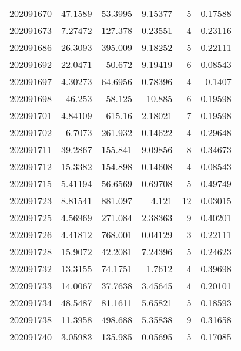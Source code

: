 \begin{tabular}{rrrrrr}
 202091670 &         47.1589  &       53.3995 &            9.15377 &           5 & 0.17588 \\
 202091673 &          7.27472 &      127.378  &            0.23551 &           4 & 0.23116 \\
 202091686 &         26.3093  &      395.009  &            9.18252 &           5 & 0.22111 \\
 202091692 &         22.0471  &       50.672  &            9.19419 &           6 & 0.08543 \\
 202091697 &          4.30273 &       64.6956 &            0.78396 &           4 & 0.1407  \\
 202091698 &         46.253   &       58.125  &           10.885   &           6 & 0.19598 \\
 202091701 &          4.84109 &      615.16   &            2.18021 &           7 & 0.19598 \\
 202091702 &          6.7073  &      261.932  &            0.14622 &           4 & 0.29648 \\
 202091711 &         39.2867  &      155.841  &            9.09856 &           8 & 0.34673 \\
 202091712 &         15.3382  &      154.898  &            0.14608 &           4 & 0.08543 \\
 202091715 &          5.41194 &       56.6569 &            0.69708 &           5 & 0.49749 \\
 202091723 &          8.81541 &      881.097  &            4.121   &          12 & 0.03015 \\
 202091725 &          4.56969 &      271.084  &            2.38363 &           9 & 0.40201 \\
 202091726 &          4.41812 &      768.001  &            0.04129 &           3 & 0.22111 \\
 202091728 &         15.9072  &       42.2081 &            7.24396 &           5 & 0.24623 \\
 202091732 &         13.3155  &       74.1751 &            1.7612  &           4 & 0.39698 \\
 202091733 &         14.0067  &       37.7638 &            3.45645 &           4 & 0.20101 \\
 202091734 &         48.5487  &       81.1611 &            5.65821 &           5 & 0.18593 \\
 202091738 &         11.3958  &      498.688  &            5.35838 &           9 & 0.31658 \\
 202091740 &          3.05983 &      135.985  &            0.05695 &           5 & 0.17085 \\

\end{tabular}
